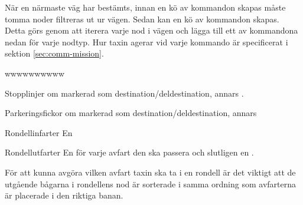 \documentclass[tekniskrapport/tech.tex]{subfiles}
\begin{document}
När en närmaste väg har bestämts, innan en kö av kommandon skapas måste tomma
noder filtreras ut ur vägen. Sedan kan en kö av kommandon skapas. Detta görs
genom att iterera varje nod i vägen och lägga till ett av kommandona nedan för
varje nodtyp. Hur taxin agerar vid varje kommando är specificerat i sektion
\ref{sec:comm-mission}.

\begin{labeling}{wwwwwwwwww}
\item[Stopplinjer] {\commStop} om markerad som destination/deldestination,
annars \commIgnore.

\item[Parkeringsfickor] {\commPark} om markerad som destination/deldestination,
annars \commIgnore 

\item[Rondellinfarter] En \commEnter

\item[Rondellutfarter] En {\commContinue} för varje
avfart den ska passera och slutligen en \commExit.

\end{labeling}
För att kunna avgöra vilken avfart taxin ska ta i en rondell är det viktigt att
de utgående bågarna i rondellens nod är sorterade i samma ordning som
avfarterna är placerade i den riktiga banan.
\end{document}

